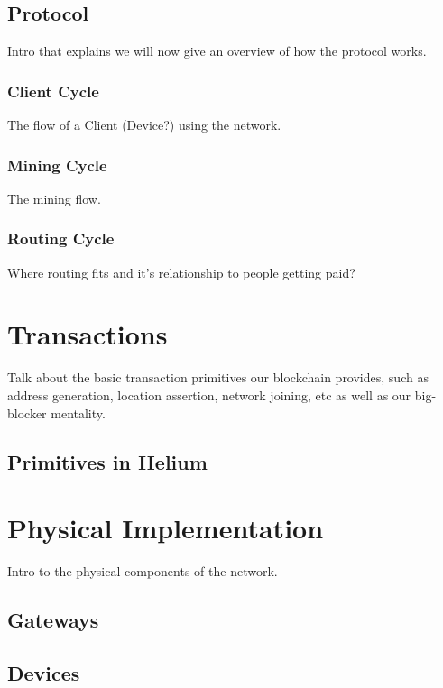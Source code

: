 \documentclass[letterpaper,11pt]{report}
\begin{document}
\subsection{Protocol}

Intro that explains we will now give an overview of how the protocol works.

\subsubsection{Client Cycle}

The flow of a Client (Device?) using the network.

\subsubsection{Mining Cycle}

The mining flow.

\subsubsection{Routing Cycle}

Where routing fits and it's relationship to people getting paid?

\section{Transactions}

Talk about the basic transaction primitives our blockchain provides, such as address generation, location assertion, network joining, etc as well as our big-blocker mentality.

\subsection{Primitives in Helium}

\section{Physical Implementation}

Intro to the physical components of the network.

\subsection{Gateways}

\subsection{Devices}
\end{document}
